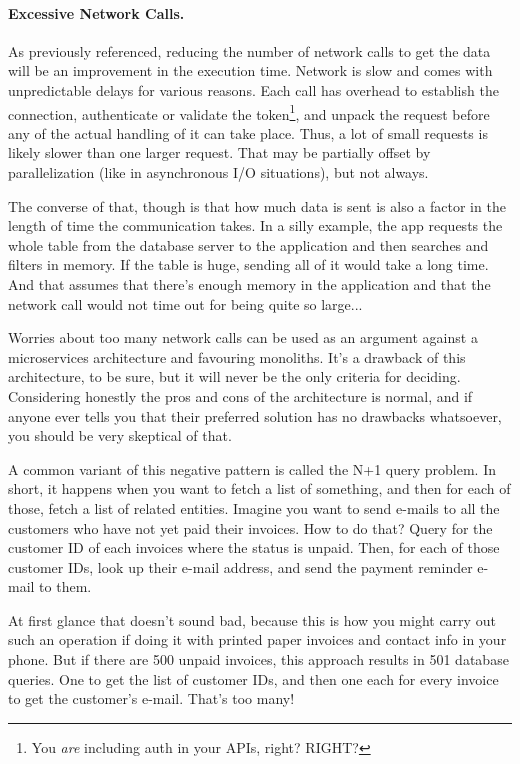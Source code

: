 \paragraph{Excessive Network Calls.}
As previously referenced, reducing the number of network calls to get the data will be an improvement in the execution time. Network is slow and comes with unpredictable delays for various reasons. Each call has overhead to establish the connection, authenticate or validate the token\footnote{You \textit{are} including auth in your APIs, right? RIGHT?}, and unpack the request before any of the actual handling of it can take place. Thus, a lot of small requests is likely slower than one larger request. That may be partially offset by parallelization (like in asynchronous I/O situations), but not always.

The converse of that, though is that how much data is sent is also a factor in the length of time the communication takes. In a silly example, the app requests the whole table from the database server to the application and then searches and filters in memory. If the table is huge, sending all of it would take a long time. And that assumes that there's enough memory in the application and that the network call would not time out for being quite so large...

Worries about too many network calls can be used as an argument against a microservices architecture and favouring monoliths. It's a drawback of this architecture, to be sure, but it will never be the only criteria for deciding. Considering honestly the pros and cons of the architecture is normal, and if anyone ever tells you that their preferred solution has no drawbacks whatsoever, you should be very skeptical of that.

A common variant of this negative pattern is called the N+1 query problem. In short, it happens when you want to fetch a list of something, and then for each of those, fetch a list of related entities. Imagine you want to send e-mails to all the customers who have not yet paid their invoices. How to do that? Query for the customer ID of each invoices where the status is unpaid. Then, for each of those customer IDs, look up their e-mail address, and send the payment reminder e-mail to them.

At first glance that doesn't sound bad, because this is how you might carry out such an operation if doing it with printed paper invoices and contact info in your phone. But if there are 500 unpaid invoices, this approach results in 501 database queries. One to get the list of customer IDs, and then one each for every invoice to get the customer's e-mail. That's too many! 

